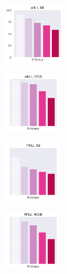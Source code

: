 

\begin{figure}[t]
    \centering
    \begin{subfigure}[b]{0.16\textwidth}
        \includegraphics[height=2.6cm]{figures/entropy_acc_abductivenli_8B}
        \caption{}
    \end{subfigure}
    \begin{subfigure}[b]{0.15\textwidth}
        \includegraphics[height=2.6cm]{figures/entropy_acc_abductivenli_405B}
        \caption{}
    \end{subfigure}
    \begin{subfigure}[b]{0.15\textwidth}
        \includegraphics[height=2.6cm]{figures/entropy_acc_mnli_matched_8B}
        \caption{}
    \end{subfigure}
    \begin{subfigure}[b]{0.15\textwidth}
        \includegraphics[height=2.6cm]{figures/entropy_acc_mnli_matched_405B}

\end{subfigure}
\end{figure}
